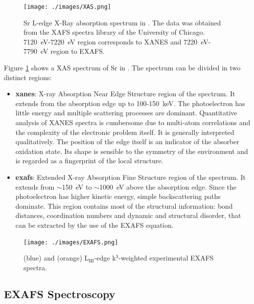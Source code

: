 \begin{figure}[h!]
\centering
\texttt{[image: ./images/XAS.png]}
\caption[X-Ray Absorption Spectrum]{ Sr
L-edge X-Ray 
absorption spectrum in . The data was obtained from the XAFS spectra library of 
the University of Chicago. 
\SI{7120}{\electronvolt}-\SI{7220}{\electronvolt} region corresponds to 
XANES and \SI{7220}{\electronvolt}-\SI{7790}{\electronvolt} region to EXAFS. }\label{xas}
\end{figure}

Figure \ref{xas} shows a XAS spectrum of Sr in . The spectrum can be divided 
in 
two distinct regions:
\begin{itemize}
 \item \textbf{\gls{xanes}}: X-ray Absorption Near Edge Structure region of the spectrum. It 
extends from the absorption edge up to 100-\SI{150}{\kilo\electronvolt}. The 
photoelectron has little energy and multiple scattering processes are dominant. Quantitative 
analysis of XANES spectra is cumbersome due to multi-atom correlations and the complexity of the 
electronic problem itself. It is generally interpreted qualitatively. The position of the edge
itself is an indicator of the absorber oxidation state. Its shape is sensible to the 
symmetry of the environment and is regarded as a fingerprint of the local structure. 
\item \textbf{\gls{exafs}}: Extended 
X-ray Absorption Fine Structure region of the spectrum. It 
extends from $\sim$\SI{150}{\electronvolt} to $\sim$\SI{1000}{\electronvolt} above the 
absorption edge. Since the photoelectron has higher kinetic energy, simple backscattering paths 
dominate. This region contains most of the structural information: bond distances, coordination 
numbers and dynamic and structural disorder, that can be extracted by the use of the EXAFS 
equation. 
\end{itemize}

\begin{figure}
\centering 
\texttt{[image: ./images/EXAFS.png]}
\label{EXAFS1}
\caption[Uranyl EXAFS spectrum]{ (blue) and  (orange)
L$_{\text{III}}$-edge 
k$^3$-weighted experimental EXAFS spectra.}
\label{EXAFS}
\end{figure}

\subsection{EXAFS Spectroscopy}

